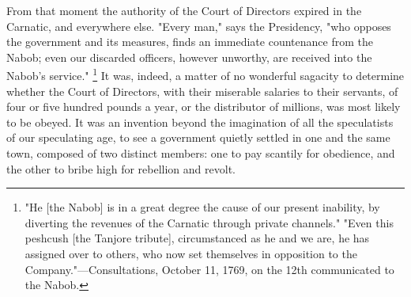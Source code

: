 From that moment the authority of the Court of Directors expired in the Carnatic, and everywhere else. "Every man," says the Presidency, "who opposes the government and its measures, finds an immediate countenance from the Nabob; even our discarded officers, however unworthy, are received into the Nabob's service."
\footnote{ "He [the Nabob] is in a great degree the cause of our present inability, by diverting the revenues of the Carnatic through private channels." "Even this peshcush [the Tanjore tribute], circumstanced as he and we are, he has assigned over to others, who now set themselves in opposition to the Company."—Consultations, October 11, 1769, on the 12th communicated to the Nabob.}
 It was, indeed, a matter of no wonderful sagacity to determine whether the Court of Directors, with their miserable salaries to their servants, of four or five hundred pounds a year, or the distributor of millions, was most likely to be obeyed. It was an invention beyond the imagination of all the speculatists of our speculating age, to see a government quietly settled in one and the same town, composed of two distinct members: one to pay scantily for obedience, and the other to bribe high for rebellion and revolt.

